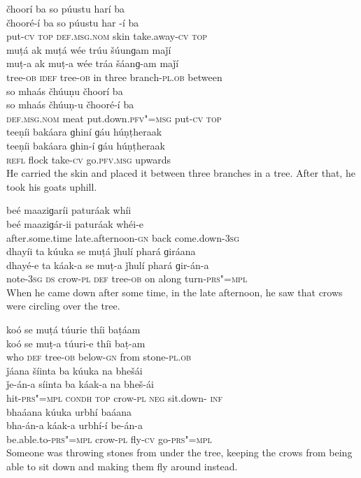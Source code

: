\begin{exe}
\ex
\label{ex:8}
\glll čhoorí	ba	so	púustu	harí	ba \\
čhooré-í	ba	so	púustu	har	-í	ba \\
put-\textsc{cv} \textsc{top} \textsc{def.msg.nom}	skin	take.away-\textsc{cv}   \textsc{top} \\
\glll muṭá	ak	muṭá	wée	trúu	šúunɡam	maǰí \\
muṭ-a	ak	muṭ-a	wée	tráa	šáanɡ-am	maǰí \\
tree-\textsc{ob} \textsc{idef}	tree-\textsc{ob}	in	three	branch-\textsc{pl.ob}	between \\
\glll so	mhaás	čhúuṇu	čhoorí	ba \\
so	mhaás	čhúuṇ-u	čhooré-í	ba \\
\textsc{def.msg.nom}	meat	put.down.\textsc{pfv"=msg}	put-\textsc{cv} \textsc{top} \\
\glll teeṇíi	bakáara	ɡhiní	ɡáu	húṇṭheraak \\
teeṇíi	bakáara	ɡhin-í	ɡáu	húṇṭheraak \\
\textsc{refl}	flock	take-\textsc{cv}	go.\textsc{pfv.msg}	upwards \\
\glt He carried the skin and placed it between three branches in a tree. After that, he took his goats uphill.

\ex
\label{ex:9}
\glll beé	maaziɡaríi	paturáak	whíi \\
beé	maaziɡár-ii	paturáak	whéi-e \\
after.some.time	late.afternoon-\textsc{gn}	back	come.down-\textsc{3sg} \\
\glll dhayíi	ta	kúuka	se	muṭá	ǰhulí	phará ɡiráana \\
dhayé-e	ta	káak-a	se	muṭ-a	ǰhulí	phará ɡir-án-a \\
note-\textsc{3sg}  \textsc{ds}	crow-\textsc{pl} \textsc{def}	tree-\textsc{ob}	on	along turn-\textsc{prs"=mpl} \\
\glt When he came down after some time, in the late afternoon, he saw that crows were circling over the tree.

\ex
\label{ex:10}
\glll koó	se	muṭá	túurie	thíi	baṭáam \\
koó	se	muṭ-a	túuri-e	thíi	baṭ-am \\
who	\textsc{def}	tree-\textsc{ob}	below-\textsc{gn}	from	stone-\textsc{pl.ob} \\
\glll ǰáana	šíinta	ba	kúuka	na	bhešái \\
ǰe-án-a	síinta	ba	káak-a	na	bheš-ái \\
hit-\textsc{prs"=mpl} \textsc{condh} \textsc{top}	crow-\textsc{pl} \textsc{neg}	sit.down- \textsc{inf} \\
\glll bhaáana	kúuka	urbhí	baáana \\
bha-án-a	káak-a	urbhí-í	be-án-a \\
be.able.to-\textsc{prs"=mpl}	crow-\textsc{pl}	fly-\textsc{cv}	go-\textsc{prs"=mpl} \\
\glt Someone was throwing stones from under the tree, keeping the crows from being able to sit down and making them fly around instead.


\end{exe}
